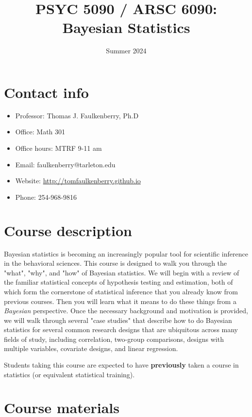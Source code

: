 \documentclass[10pt]{article}
\date{Summer 2024}
\title{PSYC 5090 / ARSC 6090: Bayesian Statistics}
\begin{document}
\maketitle

\section*{Contact info}
\label{sec:org42a7e87}
\begin{itemize}
\item Professor: Thomas J. Faulkenberry, Ph.D
\item Office: Math 301
\item Office hours: MTRF 9-11 am
\item Email: faulkenberry@tarleton.edu
\item Website: \url{http://tomfaulkenberry.github.io}
\item Phone: 254-968-9816
\end{itemize}

\section*{Course description}
\label{sec:orgff6dbf5}

Bayesian statistics is becoming an increasingly popular tool for scientific inference in the behavioral sciences. This course is designed to walk you through the "what", "why", and "how" of Bayesian statistics. We will begin with a review of the familiar statistical concepts of hypothesis testing and estimation, both of which form the cornerstone of statistical inference that you already know from previous courses. Then you will learn what it means to do these things from a \emph{Bayesian} perspective. Once the necessary background and motivation is provided, we will walk through several "case studies" that describe how to do Bayesian statistics for several common research designs that are ubiquitous across many fields of study, including correlation, two-group comparisons, designs with multiple variables, covariate designs, and linear regression.  

Students taking this course are expected to have \textbf{previously} taken a course in statistics (or equivalent statistical training). 

\section*{Course materials}
\label{sec:orgea27594}
\end{document}
